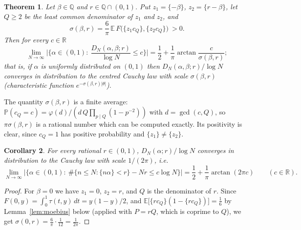 \documentclass[11pt]{amsart}
\newtheorem{theorem}{Theorem}[section]
\newtheorem{corollary}[theorem]{Corollary}
\theoremstyle{definition}
\numberwithin{equation}{section}
\newcommand{\R}{\mathbb{R}}
\newcommand{\Q}{\mathbb{Q}}
\newcommand{\E}{\mathbb{E}}
\newcommand{\Prob}{\mathbb{P}}
\newcommand{\fr}[1]{\{#1\}}
\begin{document}
\begin{theorem}\label{thm:main}
Let $\beta\in\Q$ and $r\in\Q\cap(0,1)$. Put $z_1=\fr{-\beta}$, $z_2=\fr{r-\beta}$, let $Q\ge2$ be the least common denominator of $z_1$ and
$z_2$, and
\[
\sigma(\beta,r)=\frac6\pi\,\E\,F\big(\fr{z_1c_Q},\fr{z_2c_Q}\big)\ >0 .
\]
Then for every $c\in\R$
\[
\lim_{N\to\infty}\Big|\Big\{\alpha\in(0,1):\ \frac{D_N(\alpha,\beta;r)}{\log N}\le c\Big\}\Big|=\frac12+\frac1\pi\arctan\frac{c}{\sigma(\beta,r)} ;
\]
that is, if $\alpha$ is uniformly distributed on $(0,1)$ then $D_N(\alpha,\beta;r)/\log N$ converges in distribution to the centred Cauchy law
with scale $\sigma(\beta,r)$ (characteristic function $e^{-\sigma(\beta,r)|\theta|}$).
\end{theorem}

The quantity $\sigma(\beta,r)$ is a finite average: $\Prob(c_Q=c)=\varphi(d)/(d\,Q\prod_{p\mid Q}(1-p^{-2}))$ with $d=\gcd(c,Q)$, so $\pi\sigma(\beta,r)$
is a rational number which can be computed exactly. Its positivity is clear, since $c_Q=1$ has positive probability and
$\fr{z_1}\neq\fr{z_2}$.

\begin{corollary}\label{cor:zero}
For every rational $r\in(0,1)$, $D_N(\alpha;r)/\log N$ converges in distribution to the Cauchy law with scale $1/(2\pi)$, i.e.
\[
\lim_{N\to\infty}\Big|\Big\{\alpha\in(0,1):\ \#\{n\le N:\fr{n\alpha}<r\}-Nr\le c\log N\Big\}\Big|=\frac12+\frac1\pi\arctan(2\pi c)\qquad(c\in\R).
\]
\end{corollary}

\begin{proof}
For $\beta=0$ we have $z_1=0$, $z_2=r$, and $Q$ is the denominator of $r$. Since $F(0,y)=\int_0^1\tau(t,y)\,dt=y(1-y)/2$, and
$\E\big[\fr{rc_Q}(1-\fr{rc_Q})\big]=\frac16$ by Lemma~\ref{lem:moebius} below (applied with $P=rQ$, which is coprime to $Q$), we get
$\sigma(0,r)=\frac6\pi\cdot\frac1{12}=\frac1{2\pi}$.
\end{proof}
\end{document}
